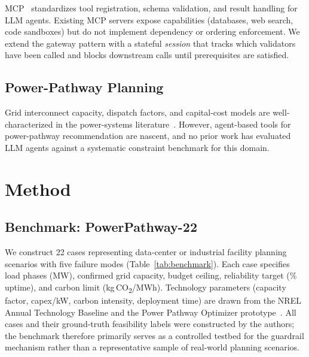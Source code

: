 \documentclass[conference]{IEEEtran}
\begin{document}
MCP~\cite{anthropic2024mcp} standardizes tool registration, schema
validation, and result handling for LLM agents.  Existing MCP servers
expose capabilities (databases, web search, code sandboxes) but do not
implement dependency or ordering enforcement.  We extend the gateway
pattern with a stateful \emph{session} that tracks which validators have
been called and blocks downstream calls until prerequisites are satisfied.

\subsection{Power-Pathway Planning}

Grid interconnect capacity, dispatch factors, and capital-cost models are
well-characterized in the power-systems literature~\cite{nrel2023atb}.
However, agent-based tools for power-pathway recommendation are nascent,
and no prior work has evaluated LLM agents against a systematic constraint
benchmark for this domain.


\section{Method}

\subsection{Benchmark: PowerPathway-22}

We construct 22 cases representing data-center or industrial facility
planning scenarios with five failure modes (Table~\ref{tab:benchmark}).
Each case specifies load phases (MW), confirmed grid capacity, budget
ceiling, reliability target (\% uptime), and carbon limit (kg\,CO\textsubscript{2}/MWh).
Technology parameters (capacity factor, capex/kW, carbon intensity,
deployment time) are drawn from the NREL Annual Technology Baseline and
the Power Pathway Optimizer prototype~\cite{ppopt}.  All cases and their
ground-truth feasibility labels were constructed by the authors; the
benchmark therefore primarily serves as a controlled testbed for the
guardrail mechanism rather than a representative sample of real-world planning
scenarios.
\end{document}
